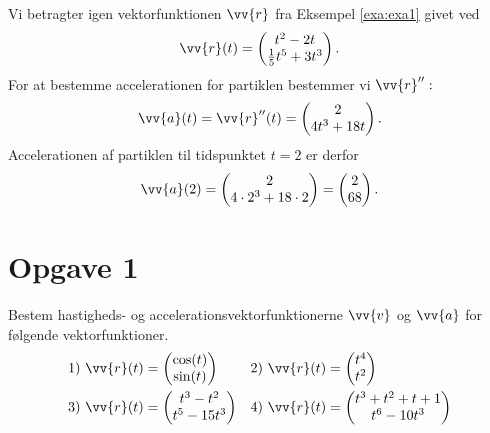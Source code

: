 \begin{exa}
	Vi betragter igen vektorfunktionen $\vv{r}$ fra Eksempel \ref{exa:exa1} givet ved
	\begin{align*}
		\vv{r}(t) = 
		\begin{pmatrix}
			t^2-2t \\
			\frac{1}{5}t^5+3t^3
		\end{pmatrix}.	
	\end{align*}
	For at bestemme accelerationen for partiklen bestemmer vi $\vv{r}'':$
	\begin{align*}
		\vv{a}(t) = \vv{r}''(t) = 
		\begin{pmatrix}
			2 \\
			4t^3 + 18t
		\end{pmatrix}.
	\end{align*}
	Accelerationen af partiklen til tidspunktet $t=2$ er derfor
	\begin{align*}
		\vv{a}(2) = 
		\begin{pmatrix}
			2 \\
			4\cdot 2^3 + 18\cdot 2
		\end{pmatrix} =
		\begin{pmatrix}
			2 \\
			68
		\end{pmatrix}.
	\end{align*}
\end{exa}

\section*{Opgave 1}

Bestem hastigheds- og accelerationsvektorfunktionerne $\vv{v}$ og $\vv{a}$ for følgende vektorfunktioner.
\begin{align*}
	&1) \ \vv{r}(t) =
	\begin{pmatrix}
		\cos(t)  \\
		\sin(t)
	\end{pmatrix}
	&&2) \ \vv{r}(t) =
	\begin{pmatrix}
		t^4  \\
		t^2
	\end{pmatrix}   \\
	&3) \ \vv{r}(t) =
	\begin{pmatrix}
		t^3-t^2  \\
		t^5-15t^3
	\end{pmatrix}
	&&4) \ \vv{r}(t) =
	\begin{pmatrix}
		t^3+t^2+t+1  \\
		t^6-10t^3
	\end{pmatrix}   \\
\end{align*}

